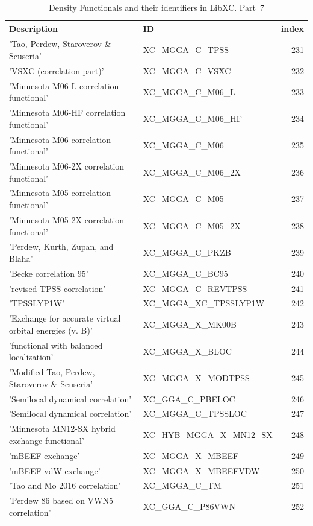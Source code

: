 \documentclass[final,12pt,makeidx,DIV=calc]{article}
\begin{document}
{{{\begin{table}[!h]
\caption{Density Functionals and their identifiers in LibXC. Part~7}
\begin{center}
\begin{tabular}{llr}
\hline
\hline
Description & ID & index\\
\hline
  'Tao, Perdew, Staroverov \& Scuseria' & XC\_MGGA\_C\_TPSS  &231\\
  'VSXC (correlation part)' & XC\_MGGA\_C\_VSXC  &232\\
  'Minnesota M06-L correlation functional' & XC\_MGGA\_C\_M06\_L  &233\\
  'Minnesota M06-HF correlation functional' & XC\_MGGA\_C\_M06\_HF  &234\\
  'Minnesota M06 correlation functional' & XC\_MGGA\_C\_M06  &235\\
  'Minnesota M06-2X correlation functional' & XC\_MGGA\_C\_M06\_2X  &236\\
  'Minnesota M05 correlation functional' & XC\_MGGA\_C\_M05  &237\\
  'Minnesota M05-2X correlation functional' & XC\_MGGA\_C\_M05\_2X  &238\\
  'Perdew, Kurth, Zupan, and Blaha' & XC\_MGGA\_C\_PKZB  &239\\
  'Becke correlation 95' & XC\_MGGA\_C\_BC95  &240\\
  'revised TPSS correlation' & XC\_MGGA\_C\_REVTPSS  &241\\
  'TPSSLYP1W' & XC\_MGGA\_XC\_TPSSLYP1W  &242\\
  'Exchange for accurate virtual orbital energies (v. B)' & XC\_MGGA\_X\_MK00B  &243\\
  'functional with balanced localization' & XC\_MGGA\_X\_BLOC  &244\\
  'Modified Tao, Perdew, Staroverov \& Scuseria' & XC\_MGGA\_X\_MODTPSS  &245\\
  'Semilocal dynamical correlation' & XC\_GGA\_C\_PBELOC  &246\\
  'Semilocal dynamical correlation' & XC\_MGGA\_C\_TPSSLOC  &247\\
  'Minnesota MN12-SX hybrid exchange functional' & XC\_HYB\_MGGA\_X\_MN12\_SX  &248\\
  'mBEEF exchange' & XC\_MGGA\_X\_MBEEF  &249\\
  'mBEEF-vdW exchange' & XC\_MGGA\_X\_MBEEFVDW  &250\\
  'Tao and Mo 2016 correlation' & XC\_MGGA\_C\_TM  &251\\
  'Perdew 86 based on VWN5 correlation' & XC\_GGA\_C\_P86VWN  &252\\

\end{tabular}
\end{center}
\end{table}}}}
\end{document}

